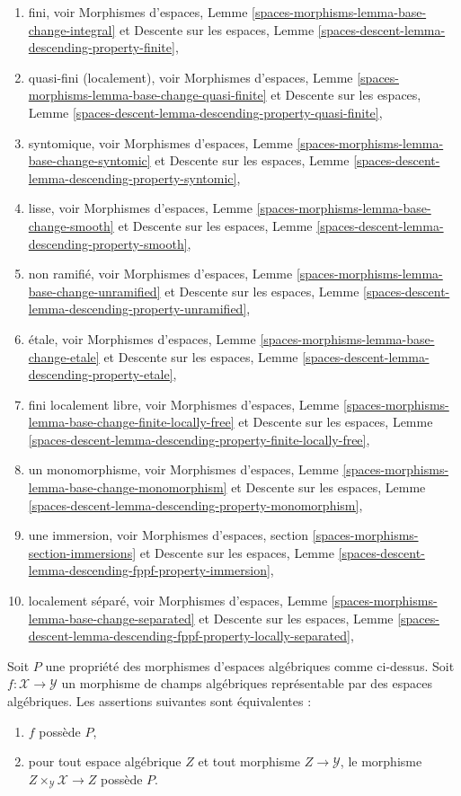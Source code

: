 \begin{enumerate}
et
Descente sur les espaces,
Lemme \ref{spaces-descent-lemma-descending-property-integral},
\item fini, voir
Morphismes d'espaces,
Lemme \ref{spaces-morphisms-lemma-base-change-integral}
et
Descente sur les espaces,
Lemme \ref{spaces-descent-lemma-descending-property-finite},
\item quasi-fini (localement), voir
Morphismes d'espaces,
Lemme \ref{spaces-morphisms-lemma-base-change-quasi-finite}
et
Descente sur les espaces,
Lemme \ref{spaces-descent-lemma-descending-property-quasi-finite},
\item syntomique, voir
Morphismes d'espaces,
Lemme \ref{spaces-morphisms-lemma-base-change-syntomic}
et
Descente sur les espaces,
Lemme \ref{spaces-descent-lemma-descending-property-syntomic},
\item lisse, voir
Morphismes d'espaces,
Lemme \ref{spaces-morphisms-lemma-base-change-smooth}
et
Descente sur les espaces,
Lemme \ref{spaces-descent-lemma-descending-property-smooth},
\item non ramifié, voir
Morphismes d'espaces,
Lemme \ref{spaces-morphisms-lemma-base-change-unramified}
et
Descente sur les espaces,
Lemme \ref{spaces-descent-lemma-descending-property-unramified},
\item \'etale, voir
Morphismes d'espaces,
Lemme \ref{spaces-morphisms-lemma-base-change-etale}
et
Descente sur les espaces,
Lemme \ref{spaces-descent-lemma-descending-property-etale},
\item fini localement libre, voir
Morphismes d'espaces,
Lemme \ref{spaces-morphisms-lemma-base-change-finite-locally-free}
et
Descente sur les espaces,
Lemme \ref{spaces-descent-lemma-descending-property-finite-locally-free},
\item un monomorphisme, voir
Morphismes d'espaces,
Lemme \ref{spaces-morphisms-lemma-base-change-monomorphism}
et
Descente sur les espaces,
Lemme \ref{spaces-descent-lemma-descending-property-monomorphism},
\item une immersion, voir
Morphismes d'espaces, section \ref{spaces-morphisms-section-immersions}
et
Descente sur les espaces,
Lemme \ref{spaces-descent-lemma-descending-fppf-property-immersion},
\item localement séparé, voir
Morphismes d'espaces,
Lemme \ref{spaces-morphisms-lemma-base-change-separated}
et
Descente sur les espaces,
Lemme \ref{spaces-descent-lemma-descending-fppf-property-locally-separated},
\end{enumerate}

\begin{lemma}
\label{lemma-property-spaces-too}
Soit $P$ une propriété des morphismes d'espaces algébriques comme ci-dessus.
Soit $f : \mathcal{X} \to \mathcal{Y}$ un morphisme de champs algébriques
représentable par des espaces algébriques. Les assertions suivantes sont équivalentes :
\begin{enumerate}
\item $f$ possède $P$,
\item pour tout espace algébrique $Z$ et tout morphisme $Z \to \mathcal{Y}$,
le morphisme $Z \times_\mathcal{Y} \mathcal{X} \to Z$ possède $P$.
\end{enumerate}
\end{lemma}

